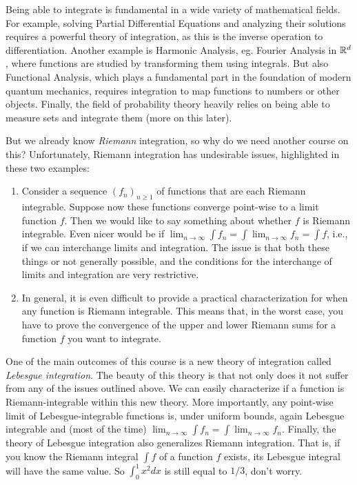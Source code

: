 Being able to integrate is fundamental in a wide variety of mathematical fields. For example, solving Partial Differential Equations and analyzing their solutions requires a powerful theory of integration, as this is the inverse operation to differentiation. Another example is Harmonic Analysis, eg. Fourier Analysis in $\mathbb R^d$, where functions are studied by transforming them using integrals. But also Functional Analysis, which plays a fundamental part in the foundation of modern quantum mechanics, requires integration to map functions to numbers or other objects. Finally,  the field of probability theory heavily relies on being able to measure sets and integrate them (more on this later). 

But we already know \emph{Riemann} integration, so why do we need another course on this? Unfortunately, Riemann integration has undesirable issues, highlighted in these two examples:
\begin{enumerate}
\item Consider a sequence $(f_n)_{n \ge 1}$ of functions that are each Riemann integrable. Suppose now these functions converge point-wise to a limit function $f$. Then we would like to say something about whether $f$ is Riemann integrable. Even nicer would be if $\lim_{n \to \infty} \int f_n = \int \lim_{n \to \infty} f_n = \int f$, i.e., if we can interchange limits and integration. The issue is that both these things or not generally possible, and the conditions for the interchange of limits and integration are very restrictive.
\item In general, it is even difficult to provide a practical characterization for when any function is Riemann integrable. This means that, in the worst case, you have to prove the convergence of the upper and lower Riemann sums for a function $f$ you want to integrate. 
\end{enumerate}

One of the main outcomes of this course is a new theory of integration called \emph{Lebesgue integration}. The beauty of this theory is that not only does it not suffer from any of the issues outlined above. We can easily characterize if a function is Riemann-integrable within this new theory. More importantly, any point-wise limit of Lebesgue-integrable functions is, under uniform bounds, again Lebesgue integrable and (most of the time) $\lim_{n \to \infty} \int f_n = \int \lim_{n \to \infty} f_n$. Finally, the theory of Lebesgue integration also generalizes Riemann integration. That is, if you know the Riemann integral $\int f$ of a function $f$ exists, its Lebesgue integral will have the same value. So $\int_0^1 x^2 dx$ is still equal to $1/3$, don't worry.

